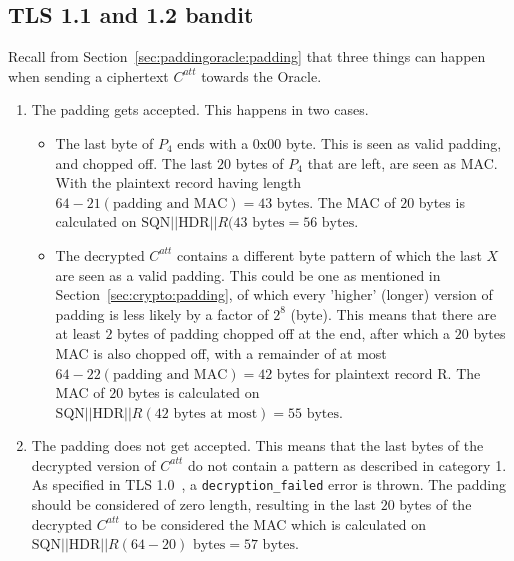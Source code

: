 \documentclass[10pt,conference,a4paper]{IEEEtran}
\begin{document}
\subsection{TLS 1.1 and 1.2 bandit}
\label{sec:lucky:bandit}
Recall from Section~\ref{sec:paddingoracle:padding} that three things can happen when sending a ciphertext $C^{att}$ towards the Oracle.
\begin{enumerate}
  \item The padding gets accepted. This happens in two cases.
	\begin{itemize}
		\item The last byte of $P_4$ ends with a $0\text{x}00$ byte. This is seen as valid padding, and chopped off. The last $20$ bytes of $P_4$ that are left, are seen as MAC. With the plaintext record having length $64 - 21 (\text{padding and MAC}) = 43 \text{ bytes}$. The MAC of $20$ bytes is calculated on $\text{SQN} || \text{HDR} || R (43 \text{ bytes} = 56\text{ bytes}$.
		\item The decrypted $C^{att}$ contains a different byte pattern of which the last $X$ are seen as a valid padding. This could be one as mentioned in Section~\ref{sec:crypto:padding}, of which every 'higher' (longer) version of padding is less likely by a factor of $2^8$ (byte). This means that there are at least $2$ bytes of padding chopped off at the end, after which a $20$ bytes MAC is also chopped off, with a remainder of at most $64 - 22 (\text{padding and MAC}) = 42 \text{ bytes}$ for plaintext record R. The MAC of $20$ bytes is calculated on $\text{SQN} || \text{HDR} || R (42 \text{ bytes at most}) = 55\text{ bytes}$.
	\end{itemize}
  \item The padding does not get accepted. This means that the last bytes of the decrypted version of $C^{att}$ do not contain a pattern as described in category 1. As specified in TLS 1.0~\cite{dierks1999rfc}, a \texttt{decryption\_failed} error is thrown. The padding should be considered of zero length, resulting in the last $20$ bytes of the decrypted $C^{att}$ to be considered the MAC which is calculated on $\text{SQN} || \text{HDR} || R (64 - 20) \text{ bytes} = 57\text{ bytes}$.
\end{enumerate}
\end{document}
